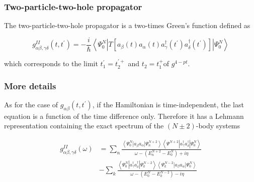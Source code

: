 \documentclass[compress]{beamer}
\begin{document}
\frame
{
\frametitle{Two-particle-two-hole propagator}
\begin{small}
{\scriptsize
The two-particle-two-hole propagator is a two-times Green's function
defined as

$$
g_{\alpha \beta, \gamma \delta}^{I I}\left(t, t^{\prime}\right)=-\frac{i}{\hbar}\left\langle\Psi_{0}^{N}\left|T\left[a_{\beta}(t) a_{\alpha}(t) a_{\gamma}^{\dagger}\left(t^{\prime}\right) a_{\delta}^{\dagger}\left(t^{\prime}\right)\right]\right| \Psi_{0}^{N}\right\rangle
$$

which corresponds to the limit $t_{1}^{\prime}=t_{2}^{\prime+}$ and $t_{2}=t_{1}^{+}$of $g^{4-p t}$.

}
\end{small}
}
\frame
{
\frametitle{More details}
\begin{small}
{\scriptsize
As for the case of $g_{\alpha \beta}\left(t, t^{\prime}\right)$, if
the Hamiltonian is time-independent, the last equation is a function of the
time difference only. Therefore it has a Lehmann representation
containing the exact spectrum of the $(N \pm 2)$-body systems

$$
\begin{aligned}
g_{\alpha \beta, \gamma \delta}^{I I}(\omega) & =\sum_{n} \frac{\left\langle\Psi_{0}^{N}\left|a_{\beta} a_{\alpha}\right| \Psi_{n}^{N+2}\right\rangle\left\langle\Psi^{N+2}\left|a_{\gamma}^{\dagger} a_{\delta}^{\dagger}\right| \Psi_{0}^{N}\right\rangle}{\omega-\left(E_{n}^{N+2}-E_{0}^{N}\right)+i \eta} \\
& -\sum_{k} \frac{\left\langle\Psi_{0}^{N}\left|a_{\gamma}^{\dagger} a_{\delta}^{\dagger}\right| \Psi_{k}^{N-2}\right\rangle\left\langle\Psi_{k}^{N-2}\left|a_{\beta} a_{\alpha}\right| \Psi_{0}^{N}\right\rangle}{\omega-\left(E_{0}^{N}-E_{k}^{N-2}\right)-i \eta}
\end{aligned}
$$

}
\end{small}
}
\frame
\end{document}
